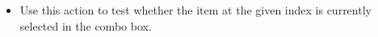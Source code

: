 
\begin{itemize}
\item Use this action to test whether the item at the given index is currently selected in the combo box.
\end{itemize}
